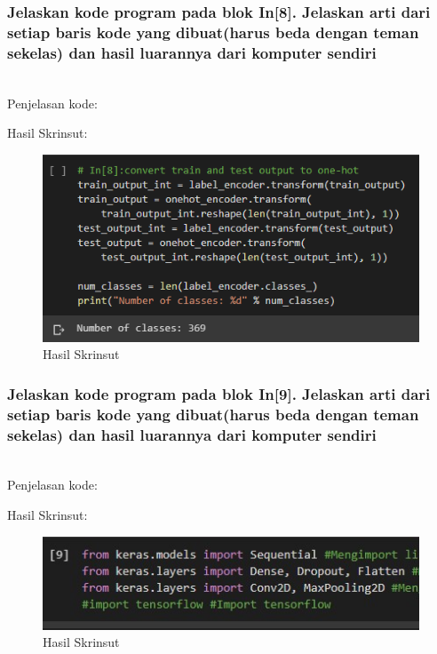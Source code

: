 \subsubsection{Jelaskan kode program pada blok In[8]. Jelaskan arti dari setiap baris kode yang dibuat(harus beda dengan teman sekelas) dan hasil luarannya dari komputer sendiri}
\hfill\\
Penjelasan kode:

Hasil Skrinsut:
\begin{figure}[H]
	\centering
	\includegraphics[scale=0.5]{figures/1174083/figures7/p8.png}
	\caption{Hasil Skrinsut}
\end{figure}


\subsubsection{Jelaskan kode program pada blok In[9]. Jelaskan arti dari setiap baris kode yang dibuat(harus beda dengan teman sekelas) dan hasil luarannya dari komputer sendiri}
\hfill\\

Penjelasan kode:

Hasil Skrinsut:
\begin{figure}[H]
	\centering
	\includegraphics[scale=0.5]{figures/1174083/figures7/p9.png}
	\caption{Hasil Skrinsut}
\end{figure}


